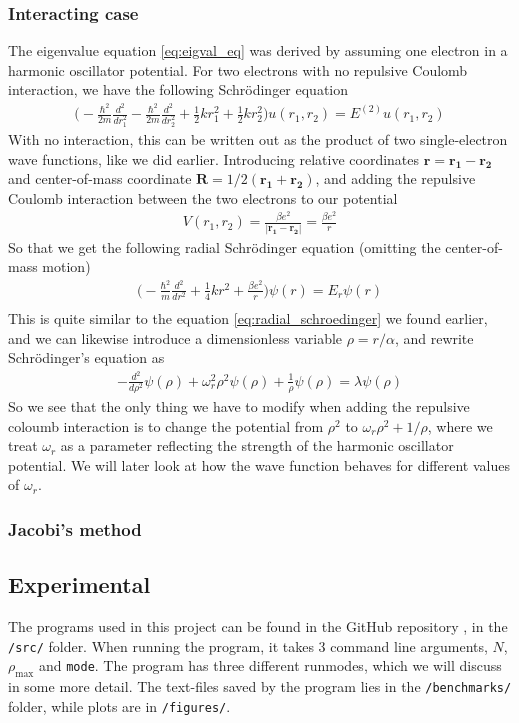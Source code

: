 \documentclass{article}
\begin{document}
\subsubsection*{Interacting case}
The eigenvalue equation \eqref{eq:eigval_eq} was derived by assuming one electron in a harmonic oscillator potential. For two electrons with no repulsive Coulomb interaction, we have the following Schrödinger equation
\begin{align*}
  \bigg(-\frac{\hbar^2}{2m}\frac{d^2}{dr_1^2} - \frac{\hbar^2}{2m}\frac{d^2}{dr_2^2} + \frac{1}{2}kr_1^2 + \frac{1}{2}kr_2^2\bigg)u(r_1,r_2) = E^{(2)}u(r_1,r_2)
\end{align*}
With no interaction, this can be written out as the product of two single-electron wave functions, like we did earlier. Introducing relative coordinates $\mathbf{r} = \mathbf{r_1} - \mathbf{r_2}$ and center-of-mass coordinate $\mathbf{R} = 1/2(\mathbf{r_1}+\mathbf{r_2})$, and adding the repulsive Coulomb interaction between the two electrons to our potential
\begin{align*}
  V(r_1,r_2) = \frac{\beta e^2}{|\mathbf{r_1}-\mathbf{r_2}|} = \frac{\beta e^2}{r}
\end{align*}
So that we get the following radial Schrödinger equation (omitting the center-of-mass motion)
\begin{align*}
  \bigg(-\frac{\hbar^2}{m}\frac{d^2}{dr^2} + \frac{1}{4}kr^2 + \frac{\beta e^2}{r}\bigg)\psi(r) = E_r\psi(r)\\
\end{align*}
This is quite similar to the equation \eqref{eq:radial_schroedinger} we found earlier, and we can likewise introduce a dimensionless variable $\rho = r/\alpha$, and rewrite Schrödinger's equation as
\begin{align*}
  -\frac{d^2}{d\rho^2}\psi(\rho) + \omega_r^2\rho^2\psi(\rho) + \frac{1}{\rho}\psi(\rho) = \lambda\psi(\rho)
\end{align*}
So we see that the only thing we have to modify when adding the repulsive coloumb interaction is to change the potential from $\rho^2$ to $\omega_r\rho^2 + 1/\rho$, where we treat $\omega_r$ as a parameter reflecting the strength of the harmonic oscillator potential. We will later look at how the wave function behaves for different values of $\omega_r$.
\subsubsection{Jacobi's method}
\subsection{Experimental}
The programs used in this project can be found in the GitHub repository \cite{Github}, in the \texttt{/src/} folder. When running the program, it takes 3 command line arguments, $N$, $\rho_{\text{max}}$ and \texttt{mode}. The program has three different runmodes, which we will discuss in some more detail. The text-files saved by the program lies in the \texttt{/benchmarks/} folder, while plots are in \texttt{/figures/}.
\end{document}
